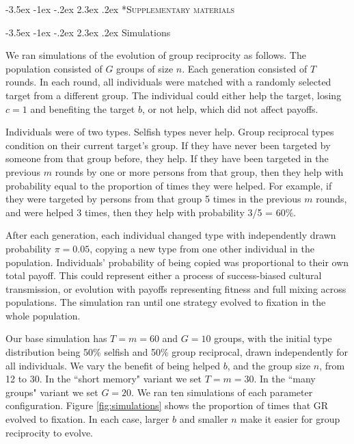 \documentclass[12pt,a4paper]{article}\usepackage[]{graphicx}\usepackage[]{color}
\makeatletter
\renewcommand\section{\@startsection {section}{1}{\z@}%
{-3.5ex \@plus -1ex \@minus -.2ex}%
{2.3ex \@plus.2ex}%
{\bf\sffamily\Large}}
\makeatother
\begin{document}
\newpage

\section*{\textsc{Supplementary materials}}

\setcounter{figure}{0}
\setcounter{section}{0}
\renewcommand\thesection{Appendix~\Alph{section}:}
\renewcommand\thefigure{\Alph{section}.\arabic{figure}}  

\section{Simulations}

We ran simulations of the evolution of group reciprocity as follows. The population consisted of $G$ groups of size $n$.
Each generation consisted of $T$ rounds. In each round, all individuals were matched with a randomly selected target 
from a different group. The individual could either help the target, losing $c = 1$ and benefiting the target $b$, or not 
help, which did not affect payoffs. 

Individuals were of two types. Selfish types never help. Group reciprocal types condition on their current target's group.
If they have never been targeted by someone from that group before, they help. If they have been targeted in the
previous $m$ rounds by one or more persons from that group, then they help with probability equal to the proportion of
times they were helped. For example, if they were targeted by persons from that group 5 times in the previous $m$ rounds,
and were helped 3 times, then they help with probability 3/5 = 60\%.

After each generation, each individual changed type with independently drawn probability $\pi = 0.05$, copying a 
new type from one other individual in the population. Individuals' probability of being copied was proportional 
to their own total payoff. This could represent either a process of success-biased cultural transmission, or evolution
with payoffs representing fitness and full mixing across populations. The simulation ran until one strategy evolved 
to fixation in the whole population.

Our base simulation has $T = m = 60$ and $G = 10$ groups, with the initial type distribution being 50\% selfish and
50\% group reciprocal, drawn independently for all individuals. We vary the benefit of being helped $b$, and the 
group size $n$, from 12 to 30. In the ``short memory" variant we set $T = m = 30$. In the ``many groups" variant 
we set $G = 20$. We ran ten simulations of each parameter configuration. Figure \ref{fig:simulations} shows the proportion of times that GR evolved to fixation. In each case, larger $b$ and smaller $n$ make it easier for
group reciprocity to evolve.
\end{document}
